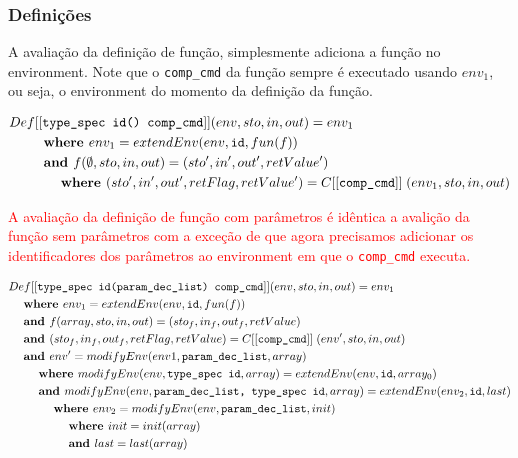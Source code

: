 \documentclass[12pt]{article}
\newcommand{\red}{\textcolor{red}}
\newcommand\eb[1]{[[\texttt{#1}]]}
\begin{document}
\subsubsection{Definições}

A avaliação da definição de função, simplesmente adiciona a função no environment. Note que o {\tt comp\_cmd} da função sempre é executado usando $env_1$, ou seja, o environment do momento da definição da função.

\red{
\begin{align*}
&Def\eb{type\_spec id() comp\_cmd} (env,sto,in,out) = env_1 \\
&\hspace{6ex}\textbf{where } env_1 = extendEnv(env, \texttt{id}, fun(f)) \\
&\hspace{6ex}\textbf{and } f(\emptyset, sto,in,out) = (sto', in', out', retValue') \\
&\hspace{9ex}\textbf{where }(sto',in',out',retFlag,retValue') = C\eb{comp\_cmd} \;(env_1,sto,in,out) \\
\end{align*}
}

\red{
A avaliação da definição de função com parâmetros é idêntica a avalição da função sem parâmetros com a exceção de que agora precisamos adicionar os identificadores dos parâmetros ao environment em que o {\tt comp\_cmd} executa.
}

\red{
\begin{align*}
&Def\eb{type\_spec id(param\_dec\_list) comp\_cmd} (env,sto,in,out) = env_1 \\
&\hspace{3ex}\textbf{where } env_1 = extendEnv(env, \texttt{id}, fun(f)) \\
&\hspace{3ex}\textbf{and } f(array,sto,in,out) = (sto_f,in_f,out_f,retValue) \\
&\hspace{3ex}\textbf{and } (sto_f,in_f,out_f,retFlag,retValue) = C\eb{comp\_cmd} \;(env',sto,in,out) \\
&\hspace{3ex}\textbf{and } env' = modifyEnv(env1, \texttt{param\_dec\_list}, array) \\
&\hspace{6ex}\textbf{where } modifyEnv(env, \texttt{type\_spec id}, array) = extendEnv(env, \texttt{id}, array_0) \\
&\hspace{6ex}\textbf{and } modifyEnv(env, \texttt{param\_dec\_list, type\_spec id}, array) = extendEnv(env_2, \texttt{id}, last) \\
&\hspace{9ex}\textbf{where } env_2 = modifyEnv(env, \texttt{param\_dec\_list}, init) \\
&\hspace{12ex}\textbf{where } init = init(array) \\
&\hspace{12ex}\textbf{and } last = last(array) \\
\end{align*}
}
\end{document}

